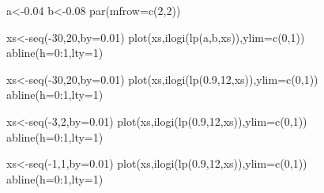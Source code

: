 \documentclass[
]{book}
\newenvironment{Shaded}{\begin{snugshade}}{\end{snugshade}}
\newcommand{\AttributeTok}[1]{\textcolor[rgb]{0.77,0.63,0.00}{#1}}
\newcommand{\DecValTok}[1]{\textcolor[rgb]{0.00,0.00,0.81}{#1}}
\newcommand{\FloatTok}[1]{\textcolor[rgb]{0.00,0.00,0.81}{#1}}
\newcommand{\FunctionTok}[1]{\textcolor[rgb]{0.00,0.00,0.00}{#1}}
\newcommand{\NormalTok}[1]{#1}
\newcommand{\OtherTok}[1]{\textcolor[rgb]{0.56,0.35,0.01}{#1}}
\newcommand{\SpecialCharTok}[1]{\textcolor[rgb]{0.00,0.00,0.00}{#1}}
\begin{document}
\begin{Shaded}
\begin{Highlighting}[]
\NormalTok{a}\OtherTok{\textless{}{-}}\FloatTok{0.04}
\NormalTok{b}\OtherTok{\textless{}{-}}\FloatTok{0.08}
\FunctionTok{par}\NormalTok{(}\AttributeTok{mfrow=}\FunctionTok{c}\NormalTok{(}\DecValTok{2}\NormalTok{,}\DecValTok{2}\NormalTok{))}

\NormalTok{xs}\OtherTok{\textless{}{-}}\FunctionTok{seq}\NormalTok{(}\SpecialCharTok{{-}}\DecValTok{30}\NormalTok{,}\DecValTok{20}\NormalTok{,}\AttributeTok{by=}\FloatTok{0.01}\NormalTok{)}
\FunctionTok{plot}\NormalTok{(xs,}\FunctionTok{ilogi}\NormalTok{(}\FunctionTok{lp}\NormalTok{(a,b,xs)),}\AttributeTok{ylim=}\FunctionTok{c}\NormalTok{(}\DecValTok{0}\NormalTok{,}\DecValTok{1}\NormalTok{))}
\FunctionTok{abline}\NormalTok{(}\AttributeTok{h=}\DecValTok{0}\SpecialCharTok{:}\DecValTok{1}\NormalTok{,}\AttributeTok{lty=}\DecValTok{1}\NormalTok{)}


\NormalTok{xs}\OtherTok{\textless{}{-}}\FunctionTok{seq}\NormalTok{(}\SpecialCharTok{{-}}\DecValTok{30}\NormalTok{,}\DecValTok{20}\NormalTok{,}\AttributeTok{by=}\FloatTok{0.01}\NormalTok{)}
\FunctionTok{plot}\NormalTok{(xs,}\FunctionTok{ilogi}\NormalTok{(}\FunctionTok{lp}\NormalTok{(}\FloatTok{0.9}\NormalTok{,}\DecValTok{12}\NormalTok{,xs)),}\AttributeTok{ylim=}\FunctionTok{c}\NormalTok{(}\DecValTok{0}\NormalTok{,}\DecValTok{1}\NormalTok{))}
\FunctionTok{abline}\NormalTok{(}\AttributeTok{h=}\DecValTok{0}\SpecialCharTok{:}\DecValTok{1}\NormalTok{,}\AttributeTok{lty=}\DecValTok{1}\NormalTok{)}


\NormalTok{xs}\OtherTok{\textless{}{-}}\FunctionTok{seq}\NormalTok{(}\SpecialCharTok{{-}}\DecValTok{3}\NormalTok{,}\DecValTok{2}\NormalTok{,}\AttributeTok{by=}\FloatTok{0.01}\NormalTok{)}
\FunctionTok{plot}\NormalTok{(xs,}\FunctionTok{ilogi}\NormalTok{(}\FunctionTok{lp}\NormalTok{(}\FloatTok{0.9}\NormalTok{,}\DecValTok{12}\NormalTok{,xs)),}\AttributeTok{ylim=}\FunctionTok{c}\NormalTok{(}\DecValTok{0}\NormalTok{,}\DecValTok{1}\NormalTok{))}
\FunctionTok{abline}\NormalTok{(}\AttributeTok{h=}\DecValTok{0}\SpecialCharTok{:}\DecValTok{1}\NormalTok{,}\AttributeTok{lty=}\DecValTok{1}\NormalTok{)}


\NormalTok{xs}\OtherTok{\textless{}{-}}\FunctionTok{seq}\NormalTok{(}\SpecialCharTok{{-}}\DecValTok{1}\NormalTok{,}\DecValTok{1}\NormalTok{,}\AttributeTok{by=}\FloatTok{0.01}\NormalTok{)}
\FunctionTok{plot}\NormalTok{(xs,}\FunctionTok{ilogi}\NormalTok{(}\FunctionTok{lp}\NormalTok{(}\FloatTok{0.9}\NormalTok{,}\DecValTok{12}\NormalTok{,xs)),}\AttributeTok{ylim=}\FunctionTok{c}\NormalTok{(}\DecValTok{0}\NormalTok{,}\DecValTok{1}\NormalTok{))}
\FunctionTok{abline}\NormalTok{(}\AttributeTok{h=}\DecValTok{0}\SpecialCharTok{:}\DecValTok{1}\NormalTok{,}\AttributeTok{lty=}\DecValTok{1}\NormalTok{)}
\end{Highlighting}
\end{Shaded}
\end{document}
